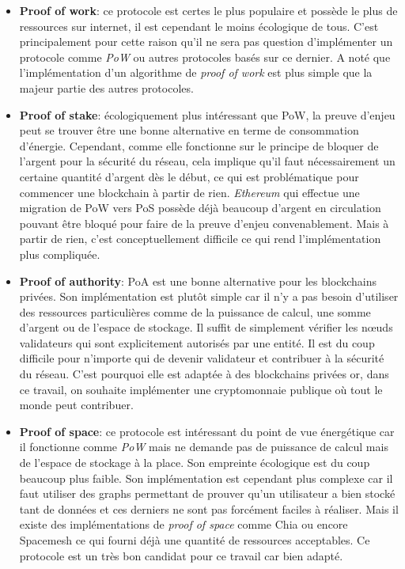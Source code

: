 \begin{itemize}
    \item \textbf{Proof of work}: ce protocole est certes le plus populaire et possède le plus de ressources sur internet, il est cependant le moins écologique de tous. C'est principalement pour cette raison qu'il ne sera pas question d'implémenter un protocole comme \textit{PoW} ou autres protocoles basés sur ce dernier. A noté que l'implémentation d'un algorithme de \textit{proof of work} est plus simple que la majeur partie des autres protocoles.
    \item \textbf{Proof of stake}: écologiquement plus intéressant que PoW, la preuve d'enjeu peut se trouver être une bonne alternative en terme de consommation d'énergie. Cependant, comme elle fonctionne sur le principe de bloquer de l'argent pour la sécurité du réseau, cela implique qu'il faut nécessairement un certaine quantité d'argent dès le début, ce qui est problématique pour commencer une blockchain à partir de rien. \textit{Ethereum} qui effectue une migration de PoW vers PoS possède déjà beaucoup d'argent en circulation pouvant être bloqué pour faire de la preuve d'enjeu convenablement. Mais à partir de rien, c'est conceptuellement difficile ce qui rend l'implémentation plus compliquée.
    \item \textbf{Proof of authority}: PoA est une bonne alternative pour les blockchains privées. Son implémentation est plutôt simple car il n'y a pas besoin d'utiliser des ressources particulières comme de la puissance de calcul, une somme d'argent ou de l'espace de stockage. Il suffit de simplement vérifier les nœuds validateurs qui sont explicitement autorisés par une entité. Il est du coup difficile pour n'importe qui de devenir validateur et contribuer à la sécurité du réseau. C'est pourquoi elle est adaptée à des blockchains privées or, dans ce travail, on souhaite implémenter une cryptomonnaie publique où tout le monde peut contribuer.
    \item \textbf{Proof of space}: ce protocole est intéressant du point de vue énergétique car il fonctionne comme \textit{PoW} mais ne demande pas de puissance de calcul mais de l'espace de stockage à la place. Son empreinte écologique est du coup beaucoup plus faible. Son implémentation est cependant plus complexe car il faut utiliser des graphs permettant de prouver qu'un utilisateur a bien stocké tant de données et ces derniers ne sont pas forcément faciles à réaliser. Mais il existe des implémentations de \textit{proof of space} comme Chia ou encore Spacemesh ce qui fourni déjà une quantité de ressources acceptables. Ce protocole est un très bon candidat pour ce travail car bien adapté.

\end{itemize}
